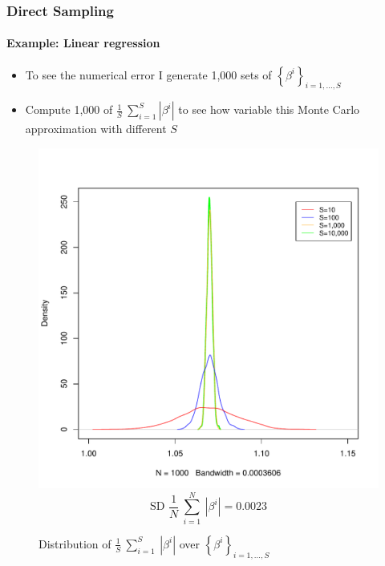 \documentclass[
  shownotes,
  xcolor={svgnames},
  hyperref={colorlinks,citecolor=DarkBlue,linkcolor=DarkRed,urlcolor=DarkBlue}
  , aspectratio=169]{beamer}
\begin{document}
\begin{frame}[fragile]
\frametitle{Direct Sampling}
\framesubtitle{Example: Linear regression}

\begin{itemize}
\item To see the numerical error I generate 1,000 sets of $\left\{ \beta^{i} \right\}_{i = 1,\ldots,S}$

\item Compute 1,000 of $\frac{1}{S}\ \sum_{i = 1}^{S}\left| \beta^{i} \right|$ to see how variable this Monte Carlo approximation with different $S$

\end{itemize}



  \begin{figure}[H] \centering
  \centering
  \caption{Distribution of $\frac{1}{S}\ \sum_{i = 1}^{S}{\ \left| \beta^{i} \right|}$ over $\left\{ \beta^{i} \right\}_{i = 1,\ldots,S}$}
  \includegraphics[scale=0.2]{figures/n10000}
  \\
  \tiny 
  $$\text{SD\ }\frac{1}{N}\ \sum_{i = 1}^{N}{\ \left| \beta^{i} \right|} = 0.0023$$
\end{figure}  




 \end{frame}
\end{document}
